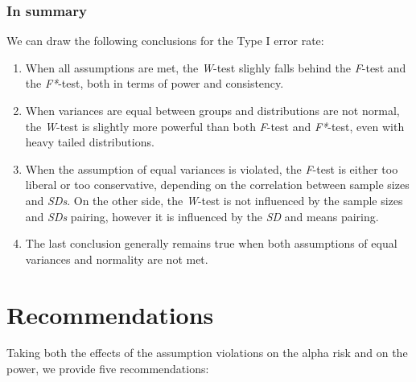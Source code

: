 \documentclass[man,floatsintext]{apa6}
\providecommand{\tightlist}{%
  \setlength{\itemsep}{0pt}\setlength{\parskip}{0pt}}
\begin{document}
\subsubsection{In summary}\label{in-summary-1}

We can draw the following conclusions for the Type I error rate:

\begin{enumerate}
\def\labelenumi{\arabic{enumi})}
\tightlist
\item
  When all assumptions are met, the \emph{W}-test slighly falls behind
  the \emph{F}-test and the \emph{F*}-test, both in terms of power and
  consistency.
\item
  When variances are equal between groups and distributions are not
  normal, the \emph{W}-test is slightly more powerful than both
  \emph{F}-test and \emph{F*}-test, even with heavy tailed
  distributions.
\item
  When the assumption of equal variances is violated, the \emph{F}-test
  is either too liberal or too conservative, depending on the
  correlation between sample sizes and \emph{SDs}. On the other side,
  the \emph{W}-test is not influenced by the sample sizes and \emph{SDs}
  pairing, however it is influenced by the \emph{SD} and means pairing.
\item
  The last conclusion generally remains true when both assumptions of
  equal variances and normality are not met.
\end{enumerate}

\section{Recommendations}\label{recommendations}

Taking both the effects of the assumption violations on the alpha risk
and on the power, we provide five recommendations:
\end{document}
